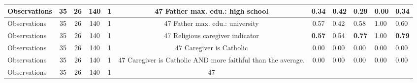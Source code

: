 \begin{tabular}{l c c c c c c }
\midrule
Observations &        35 &        26 &       140 &         1 &        47
Father max. edu.: high school &      0.34 &      0.42 & \textbf{     0.29} &      0.00 &      0.34 \\
\midrule
Observations &        35 &        26 &       140 &         1 &        47
Father max. edu.: university &      0.57 &      0.42 &      0.58 &      1.00 &      0.60 \\
\midrule
Observations &        35 &        26 &       140 &         1 &        47
Religious caregiver indicator & \textbf{     0.57} &      0.54 & \textbf{     0.77} &      1.00 & \textbf{     0.79} \\
\midrule
Observations &        35 &        26 &       140 &         1 &        47
Caregiver is Catholic &      0.00 &      0.00 &      0.00 &      0.00 &      0.00 \\
\midrule
Observations &        35 &        26 &       140 &         1 &        47
Caregiver is Catholic AND more faithful than the average. &      0.00 &      0.00 &      0.00 &      0.00 &      0.00 \\
\midrule
Observations &        35 &        26 &       140 &         1 &        47
\bottomrule
\end{tabular}
